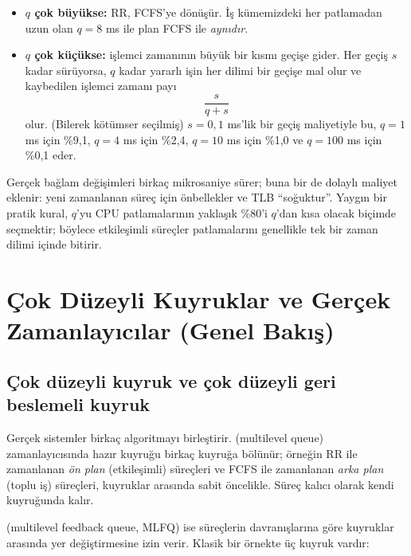 \begin{itemize}
  \item \textbf{$q$ çok büyükse:} RR, FCFS'ye dönüşür. İş kümemizdeki her patlamadan uzun olan $q = 8$ ms ile plan FCFS ile \emph{aynıdır}.
  \item \textbf{$q$ çok küçükse:} işlemci zamanının büyük bir kısmı geçişe gider. Her geçiş $s$ kadar sürüyorsa, $q$ kadar yararlı işin her dilimi bir geçişe mal olur ve kaybedilen işlemci zamanı payı
\[
\frac{s}{q+s}
\]
olur. (Bilerek kötümser seçilmiş) $s=0{,}1$ ms'lik bir geçiş maliyetiyle bu, $q=1$ ms için \%9,1, $q=4$ ms için \%2,4, $q=10$ ms için \%1,0 ve $q=100$ ms için \%0,1 eder.
\end{itemize}

Gerçek bağlam değişimleri birkaç mikrosaniye sürer; buna bir de dolaylı maliyet eklenir: yeni zamanlanan süreç için önbellekler ve TLB ``soğuktur''. Yaygın bir pratik kural, $q$'yu CPU patlamalarının yaklaşık \%80'i $q$'dan kısa olacak biçimde seçmektir; böylece etkileşimli süreçler patlamalarını genellikle tek bir zaman dilimi içinde bitirir.

\section{Çok Düzeyli Kuyruklar ve Gerçek Zamanlayıcılar (Genel Bakış)}

\subsection{Çok düzeyli kuyruk ve çok düzeyli geri beslemeli kuyruk}

Gerçek sistemler birkaç algoritmayı birleştirir.  (multilevel queue) zamanlayıcısında hazır kuyruğu birkaç kuyruğa bölünür; örneğin RR ile zamanlanan \emph{ön plan} (etkileşimli) süreçleri ve FCFS ile zamanlanan \emph{arka plan} (toplu iş) süreçleri, kuyruklar arasında sabit öncelikle. Süreç kalıcı olarak kendi kuyruğunda kalır.

 (multilevel feedback queue, MLFQ) ise süreçlerin davranışlarına göre kuyruklar arasında yer değiştirmesine izin verir. Klasik bir örnekte üç kuyruk vardır:

